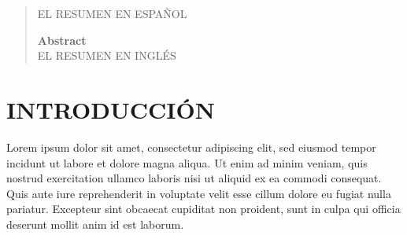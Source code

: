 \documentclass[12pt,a4paper,twoside]{article} %
\begin{document}
\begin{abstract}
	EL RESUMEN EN ESPAÑOL
	\begin{center}
		\textbf{Abstract}\\
		\justify
		EL RESUMEN EN INGLÉS
	\end{center}
	\hrulefill
\end{abstract}
\pagebreak
{}
\setcounter{page}{1}
\tableofcontents
\newpage
\listoftables
\newpage
\listoffigures
\newpage




\setcounter{page}{1}

\section{INTRODUCCIÓN}
Lorem ipsum dolor sit amet, consectetur adipiscing elit, sed eiusmod tempor incidunt ut labore et dolore magna aliqua. Ut enim ad minim veniam, quis nostrud exercitation ullamco laboris nisi ut aliquid ex ea commodi consequat. Quis aute iure reprehenderit in voluptate velit esse cillum dolore eu fugiat nulla pariatur. Excepteur sint obcaecat cupiditat non proident, sunt in culpa qui officia deserunt mollit anim id est laborum.
\end{document}
